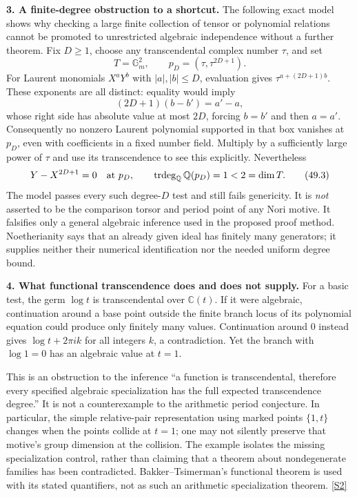 \documentclass[11pt,a4paper]{article}
\newcommand{\Q}{\mathbb{Q}}
\newcommand{\C}{\mathbb{C}}
\newcommand{\sref}[2]{\hyperlink{source:#1:#2}{[S#2]}}
\numberwithin{equation}{section}
\begin{document}
\textbf{3. A finite-degree obstruction to a shortcut.}
The following exact model shows why checking a large finite collection
of tensor or polynomial relations cannot be promoted to unrestricted
algebraic independence without a further theorem. Fix $D\ge1$, choose
any transcendental complex number $\tau$, and set
\[
 T=\mathbb G_m^2,\qquad
 p_D=(\tau,\tau^{2D+1}).
\]
For Laurent monomials $X^aY^b$ with $|a|,|b|\le D$, evaluation gives
$\tau^{a+(2D+1)b}$. These exponents are all distinct: equality would
imply
\[
 (2D+1)(b-b')=a'-a,
\]
whose right side has absolute value at most $2D$, forcing $b=b'$ and then
$a=a'$. Consequently no nonzero Laurent polynomial supported in that box
vanishes at $p_D$, even with coefficients in a fixed number field. Multiply
by a sufficiently large power of $\tau$ and use its transcendence to see
this explicitly. Nevertheless
\[
 Y-X^{2D+1}=0\quad\hbox{at }p_D,\qquad
 \operatorname{trdeg}_{\Q}\Q(p_D)=1<2=\dim T.
 \tag{49.3}
\]
The model passes every such degree-$D$ test and still fails genericity.
It is \emph{not} asserted to be the comparison torsor and period point
of any Nori motive. It falsifies only a general algebraic inference used
in the proposed proof method. Noetherianity says that an already given
ideal has finitely many generators; it supplies neither their numerical
identification nor the needed uniform degree bound.

\textbf{4. What functional transcendence does and does not supply.}
For a basic test, the germ $\log t$ is transcendental over $\C(t)$.
If it were algebraic, continuation around a base point outside the finite
branch locus of its polynomial equation could produce only finitely many
values. Continuation around $0$ instead gives $\log t+2\pi i k$ for all
integers $k$, a contradiction. Yet the branch with $\log1=0$ has an
algebraic value at $t=1$.

This is an obstruction to the inference ``a function is transcendental,
therefore every specified algebraic specialization has the full expected
transcendence degree.'' It is not a counterexample to the arithmetic period
conjecture. In particular, the simple relative-pair representation using
marked points $\{1,t\}$ changes when the points collide at $t=1$; one may
not silently preserve that motive's group dimension at the collision.
The example isolates the missing specialization control, rather than
claiming that a theorem about nondegenerate families has been contradicted.
Bakker--Tsimerman's functional theorem is used with its stated quantifiers,
not as such an arithmetic specialization theorem. \sref{30006975}{2}
\end{document}
